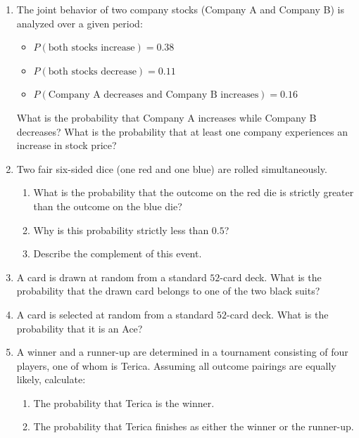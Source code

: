 \documentclass[10pt, twocolumn]{article}
\begin{document}
\begin{enumerate}[label=\textbf{1.2.\arabic*}]
    \item The joint behavior of two company stocks (Company A and Company B) is analyzed over a given period:
    \begin{itemize}
        \item $P(\text{both stocks increase}) = 0.38$
        \item $P(\text{both stocks decrease}) = 0.11$
        \item $P(\text{Company A decreases and Company B increases}) = 0.16$
    \end{itemize}
    What is the probability that Company A increases while Company B decreases? What is the probability that at least one company experiences an increase in stock price?

    \item Two fair six-sided dice (one red and one blue) are rolled simultaneously. 
    \begin{enumerate}[label=\textbf{(\alph*)}]
        \item What is the probability that the outcome on the red die is strictly greater than the outcome on the blue die?
        \item Why is this probability strictly less than $0.5$?
        \item Describe the complement of this event.
    \end{enumerate}

    \item A card is drawn at random from a standard $52$-card deck. What is the probability that the drawn card belongs to one of the two black suits?

    \item A card is selected at random from a standard $52$-card deck. What is the probability that it is an Ace?

    \item A winner and a runner-up are determined in a tournament consisting of four players, one of whom is Terica. Assuming all outcome pairings are equally likely, calculate:
    \begin{enumerate}[label=\textbf{(\alph*)}]
        \item The probability that Terica is the winner.
        \item The probability that Terica finishes as either the winner or the runner-up.
    \end{enumerate}


\end{enumerate}
\end{document}
